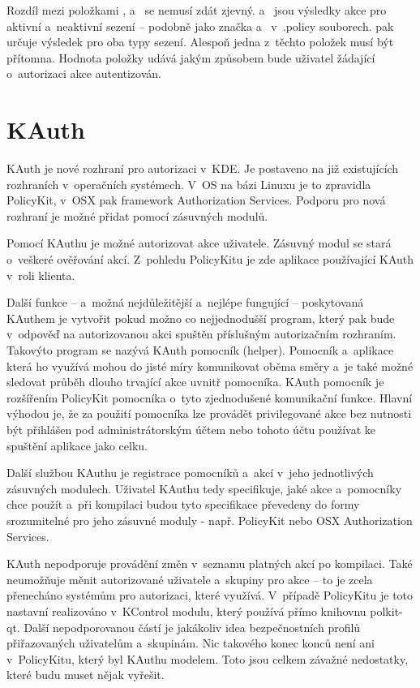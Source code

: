 {Rozdíl mezi položkami ,  a~ se nemusí zdát zjevný.  a~ jsou výsledky akce pro aktivní a~neaktivní sezení -- podobně jako značka  a~ v~.policy souborech.  pak určuje výsledek pro oba typy sezení. Alespoň jedna z~těchto položek musí být přítomna. Hodnota položky udává jakým způsobem bude uživatel žádající o~autorizaci akce autentizován.

\section{KAuth}
KAuth je nové rozhraní pro autorizaci v~KDE. Je postaveno na již existujících rozhraních v~operačních systémech. V~OS na bázi Linuxu je to zpravidla PolicyKit, v~OSX pak framework Authorization Services. Podporu pro nová rozhraní je možné přidat pomocí zásuvných modulů.

Pomocí KAuthu je možné autorizovat akce uživatele. Zásuvný modul se stará o~veškeré ověřování akcí. Z~pohledu PolicyKitu je zde aplikace používající KAuth v~roli klienta.

Další funkce -- a~možná nejdůležitější a~nejlépe fungující -- poskytovaná KAuthem je vytvořit pokud možno co nejjednodušší program, který pak bude v~odpověď na autorizovanou akci spuštěn příslušným autorizačním rozhraním. Takovýto program se nazývá KAuth pomocník (helper). Pomocník a~aplikace která ho využívá mohou do jisté míry komunikovat oběma směry a~je také možné sledovat průběh dlouho trvající akce uvnitř pomocníka. KAuth pomocník je rozšířením PolicyKit pomocníka o~tyto zjednodušené komunikační funkce. Hlavní výhodou je, že za použití pomocníka lze provádět privilegované akce bez nutnosti být přihlášen pod administrátorským účtem nebo tohoto účtu používat ke spuštění aplikace jako celku.

Další službou KAuthu je registrace pomocníků a~akcí v~jeho jednotlivých zásuvných modulech. Uživatel KAuthu tedy specifikuje, jaké akce a~pomocníky chce použít a~při kompilaci budou tyto specifikace převedeny do formy srozumitelné pro jeho zásuvné moduly - např. PolicyKit nebo OSX Authorization Services.

KAuth nepodporuje provádění změn v~seznamu platných akcí po kompilaci. Také neumožňuje měnit autorizované uživatele a~skupiny pro akce -- to je zcela přenecháno systémům pro autorizaci, které využívá. V~případě PolicyKitu je toto nastavní realizováno v~KControl modulu, který používá přímo knihovnu polkit-qt. Další nepodporovanou částí je jakákoliv idea bezpečnostních profilů přiřazovaných uživatelům a~skupinám. Nic takového konec konců není ani v~PolicyKitu, který byl KAuthu modelem. Toto jsou celkem závažné nedostatky, které budu muset nějak vyřešit.

}
